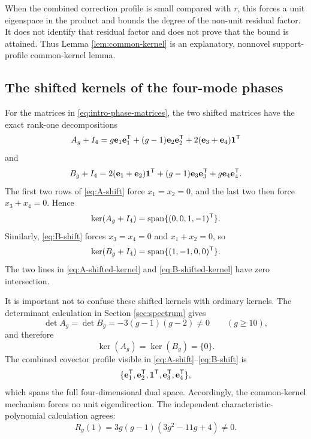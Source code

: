 \documentclass[11pt]{article}
\theoremstyle{remark}
\numberwithin{equation}{section}
\begin{document}
When the combined correction profile is small compared with \(r\), this
forces a unit eigenspace in the product and bounds the degree of the
non-unit residual factor.  It does not identify that residual factor and
does not prove that the bound is attained.  Thus Lemma \ref{lem:common-kernel}
is an explanatory, nonnovel support-profile common-kernel lemma.

\subsection{The shifted kernels of the four-mode phases}

For the matrices in \eqref{eq:intro-phase-matrices}, the two shifted
matrices have the exact rank-one decompositions
\begin{equation}\label{eq:A-shift}
A_g+I_4
=g\mathbf{e}_1\mathbf{e}_1^{\mathsf{T}}
+(g-1)\mathbf{e}_2\mathbf{e}_2^{\mathsf{T}}
+2(\mathbf{e}_3+\mathbf{e}_4)\mathbf{1}^{\mathsf{T}}
\end{equation}
and
\begin{equation}\label{eq:B-shift}
B_g+I_4
=2(\mathbf{e}_1+\mathbf{e}_2)\mathbf{1}^{\mathsf{T}}
+(g-1)\mathbf{e}_3\mathbf{e}_3^{\mathsf{T}}
+g\mathbf{e}_4\mathbf{e}_4^{\mathsf{T}}.
\end{equation}
The first two rows of \eqref{eq:A-shift} force \(x_1=x_2=0\), and the last
two then force \(x_3+x_4=0\).  Hence
\begin{equation}\label{eq:A-shifted-kernel}
\ker(A_g+I_4)
=\operatorname{span}\{(0,0,1,-1)^{\mathsf{T}}\}.
\end{equation}
Similarly, \eqref{eq:B-shift} forces \(x_3=x_4=0\) and
\(x_1+x_2=0\), so
\begin{equation}\label{eq:B-shifted-kernel}
\ker(B_g+I_4)
=\operatorname{span}\{(1,-1,0,0)^{\mathsf{T}}\}.
\end{equation}
The two lines in \eqref{eq:A-shifted-kernel} and
\eqref{eq:B-shifted-kernel} have zero intersection.

It is important not to confuse these shifted kernels with ordinary
kernels.  The determinant calculation in Section \ref{sec:spectrum} gives
\[
\det A_g=\det B_g=-3(g-1)(g-2)\neq0
\qquad(g\geq10),
\]
and therefore
\begin{equation}\label{eq:ordinary-kernels}
\ker(A_g)=\ker(B_g)=\{0\}.
\end{equation}
The combined covector profile visible in
\eqref{eq:A-shift}--\eqref{eq:B-shift} is
\[
\{\mathbf{e}_1^{\mathsf{T}},\mathbf{e}_2^{\mathsf{T}},\mathbf{1}^{\mathsf{T}},
\mathbf{e}_3^{\mathsf{T}},\mathbf{e}_4^{\mathsf{T}}\},
\]
which spans the full four-dimensional dual space.  Accordingly, the
common-kernel mechanism forces no unit eigendirection.  The independent
characteristic-polynomial calculation agrees:
\[
R_g(1)=3g(g-1)(3g^2-11g+4)\neq0.
\]
\end{document}
